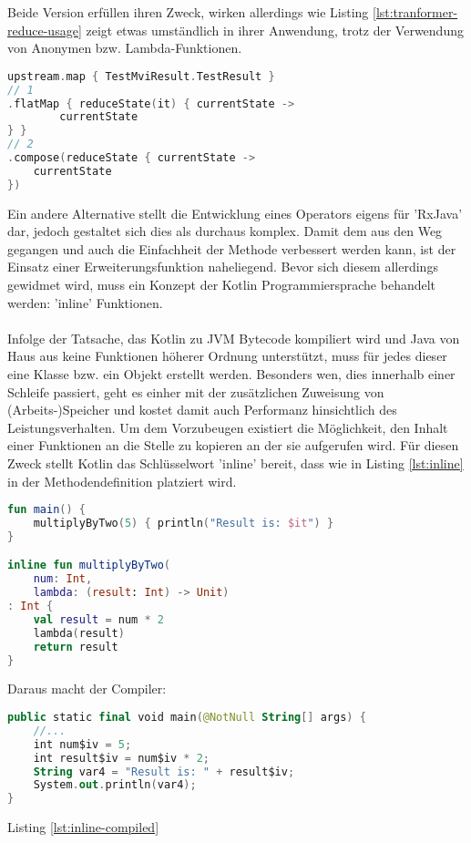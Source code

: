 Beide Version erfüllen ihren Zweck, wirken allerdings wie Listing 
\ref{lst:tranformer-reduce-usage}
zeigt etwas umständlich in ihrer Anwendung, trotz der Verwendung von Anonymen bzw. Lambda-Funktionen.
\begin{lstlisting}[caption={2. Versuch}, label={lst:versuch-2},language=Kotlin]
upstream.map { TestMviResult.TestResult }
// 1
.flatMap { reduceState(it) { currentState ->
		currentState
} }
// 2
.compose(reduceState { currentState ->
	currentState
})
\end{lstlisting}
\bigskip
Ein andere Alternative stellt die Entwicklung eines Operators eigens für 'RxJava' dar, jedoch gestaltet sich dies als durchaus komplex.
\cite{rxjavaCustomOperator}
Damit dem aus den Weg gegangen und auch die Einfachheit der Methode verbessert werden kann, ist der Einsatz einer Erweiterungsfunktion naheliegend. Bevor sich diesem allerdings gewidmet wird, muss ein Konzept der Kotlin Programmiersprache behandelt werden: 'inline' Funktionen.
\\\\
Infolge der Tatsache, das Kotlin zu JVM Bytecode kompiliert wird und Java von Haus aus keine Funktionen höherer Ordnung unterstützt, muss für jedes dieser eine Klasse bzw. ein Objekt erstellt werden. Besonders wen, dies innerhalb einer Schleife passiert, geht es einher mit der zusätzlichen Zuweisung von (Arbeits-)Speicher und kostet damit auch Performanz hinsichtlich des Leistungsverhalten. Um dem Vorzubeugen existiert die Möglichkeit, den Inhalt einer Funktionen an die Stelle zu kopieren an der sie aufgerufen wird. Für diesen Zweck stellt Kotlin das Schlüsselwort 'inline' bereit, dass wie in Listing 
\ref{lst:inline}
in der Methodendefinition platziert wird.
\begin{lstlisting}[caption={inline}, label={lst:inline},language=Kotlin]
fun main() {
	multiplyByTwo(5) { println("Result is: $it") }
}

inline fun multiplyByTwo(
	num: Int, 
	lambda: (result: Int) -> Unit)
: Int {
	val result = num * 2
	lambda(result)
	return result
}
\end{lstlisting}
\bigskip
Daraus macht der Compiler:
\begin{lstlisting}[caption={inline kompiliert}, label={lst:inline-compiled},language=Kotlin]
public static final void main(@NotNull String[] args) {
	//...
	int num$iv = 5;
	int result$iv = num$iv * 2;
	String var4 = "Result is: " + result$iv;
	System.out.println(var4);
}
\end{lstlisting}
\bigskip
Listing
\ref{lst:inline-compiled}
